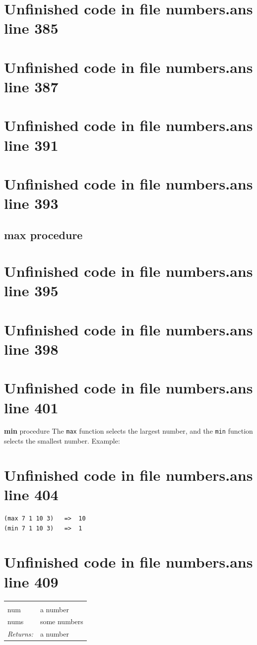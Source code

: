 \documentclass[twoside,9pt]{report}
\begin{document}
\section{Unfinished code in file numbers.ans line 385}
\section{Unfinished code in file numbers.ans line 387}
\section{Unfinished code in file numbers.ans line 391}
\section{Unfinished code in file numbers.ans line 393}
\subsection{max procedure}
\label{max-procedure}
\section{Unfinished code in file numbers.ans line 395}

\section{Unfinished code in file numbers.ans line 398}
\section{Unfinished code in file numbers.ans line 401}

\textbf{min} procedure The \texttt{max} function selects the largest number, and the \texttt{min} function selects the smallest number. Example:

\section{Unfinished code in file numbers.ans line 404}
\begin{verbatim}
(max 7 1 10 3)   =>  10
(min 7 1 10 3)   =>  1
\end{verbatim}
\section{Unfinished code in file numbers.ans line 409}
\noindent\begin{tabular}{ |p{1.9cm} p{8cm}| }
\hline
\rowcolor[HTML]{CCCCCC} \multicolumn{2}{|l|}{\bf max, min (public)} \\
num & a number \\
nums & some numbers \\
\textit{Returns:} & a number \\
\hline
\end{tabular}
\end{document}
